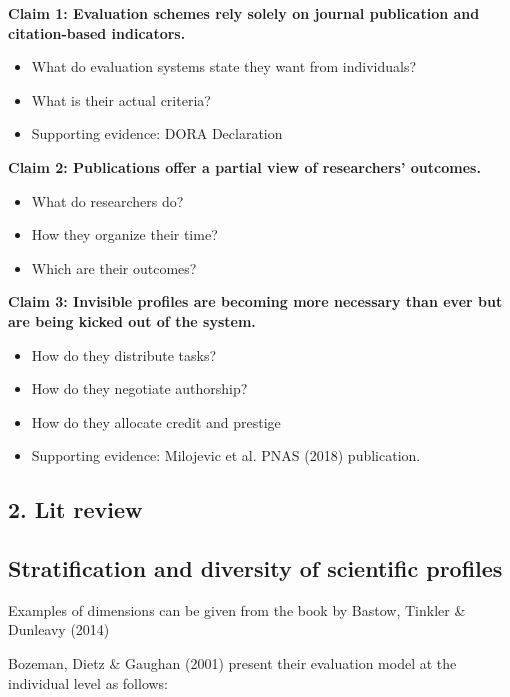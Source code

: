 \documentclass[]{article}
\providecommand{\tightlist}{%
  \setlength{\itemsep}{0pt}\setlength{\parskip}{0pt}}
\begin{document}
\textbf{Claim 1: Evaluation schemes rely solely on journal publication
and citation-based indicators.}

\begin{itemize}
\tightlist
\item
  What do evaluation systems state they want from individuals?
\item
  What is their actual criteria?
\item
  Supporting evidence: DORA Declaration
\end{itemize}

\textbf{Claim 2: Publications offer a partial view of researchers'
outcomes.}

\begin{itemize}
\tightlist
\item
  What do researchers do?
\item
  How they organize their time?
\item
  Which are their outcomes?
\end{itemize}

\textbf{Claim 3: Invisible profiles are becoming more necessary than
ever but are being kicked out of the system.}

\begin{itemize}
\tightlist
\item
  How do they distribute tasks?
\item
  How do they negotiate authorship?
\item
  How do they allocate credit and prestige
\item
  Supporting evidence: Milojevic et al. PNAS (2018) publication.
\end{itemize}

\subsection{2. Lit review}\label{lit-review}

\subsection{Stratification and diversity of scientific
profiles}\label{stratification-and-diversity-of-scientific-profiles}

Examples of dimensions can be given from the book by Bastow, Tinkler \&
Dunleavy (2014)

Bozeman, Dietz \& Gaughan (2001) present their evaluation model at the
individual level as follows:
\end{document}
